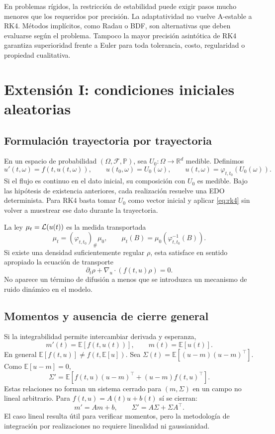 \documentclass[11pt,a4paper]{article}
\theoremstyle{definition}\newtheorem{definition}[theorem]{Definición}
\theoremstyle{remark}\newtheorem{remark}[theorem]{Observación}
\newcommand{\R}{\mathbb R}\newcommand{\E}{\mathbb E}
\newcommand{\Prob}{\mathbb P}\newcommand{\norm}[1]{\left\lVert#1\right\rVert}
\begin{document}
En problemas rígidos, la restricción de estabilidad puede exigir pasos
mucho menores que los requeridos por precisión. La adaptatividad no vuelve
A-estable a RK4. Métodos implícitos, como Radau o BDF, son alternativas que
deben evaluarse según el problema. Tampoco la mayor precisión asintótica
de RK4 garantiza superioridad frente a Euler para toda tolerancia, costo,
regularidad o propiedad cualitativa.

\clearpage
\section{Extensión I: condiciones iniciales aleatorias}
\subsection{Formulación trayectoria por trayectoria}
En un espacio de probabilidad $(\Omega,\mathcal F,\Prob)$, sea
$U_0:\Omega\to\R^d$ medible. Definimos
\begin{equation}\label{eq:random}
 u'(t,\omega)=f(t,u(t,\omega)),\qquad
 u(t_0,\omega)=U_0(\omega),\qquad
 u(t,\omega)=\varphi_{t,t_0}(U_0(\omega)).
\end{equation}
Si el flujo es continuo en el dato inicial, su composición con $U_0$ es
medible. Bajo las hipótesis de existencia anteriores, cada realización
resuelve una EDO determinista. Para RK4 basta tomar $U_0$ como vector inicial
y aplicar \eqref{eq:rk4} sin volver a muestrear ese dato durante la trayectoria.

La ley $\mu_t=\mathcal L(u(t))$ es la medida transportada
\[
 \mu_t=(\varphi_{t,t_0})_\#\mu_0,
 \qquad \mu_t(B)=\mu_0(\varphi_{t,t_0}^{-1}(B)).
\]
Si existe una densidad suficientemente regular $\rho$, esta satisface en
sentido apropiado la ecuación de transporte
\[
 \partial_t\rho+\nabla_u\!\cdot(f(t,u)\rho)=0.
\]
No aparece un término de difusión a menos que se introduzca un mecanismo
de ruido dinámico en el modelo.

\subsection{Momentos y ausencia de cierre general}
Si la integrabilidad permite intercambiar derivada y esperanza,
\[
 m'(t)=\E[f(t,u(t))],\qquad m(t)=\E[u(t)].
\]
En general $\E[f(t,u)]\neq f(t,\E[u])$. Sea
$\Sigma(t)=\E[(u-m)(u-m)^\top]$. Como $\E[u-m]=0$,
\[
 \Sigma'=\E\!\left[f(t,u)(u-m)^\top+(u-m)f(t,u)^\top\right].
\]
Estas relaciones no forman un sistema cerrado para $(m,\Sigma)$ en un
campo no lineal arbitrario. Para $f(t,u)=A(t)u+b(t)$ sí se cierran:
\[
 m'=Am+b,\qquad\Sigma'=A\Sigma+\Sigma A^\top.
\]
El caso lineal resulta útil para verificar momentos, pero la metodología de
integración por realizaciones no requiere linealidad ni gaussianidad.
\end{document}
